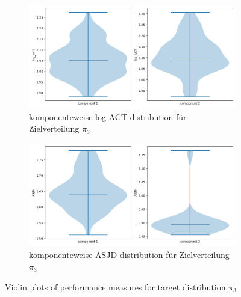 \documentclass{scrartcl}
\begin{document}
    \begin{figure}
        \centering
        \begin{subfigure}{0.45\textheight}
              \centering
              \includegraphics[width=.8\linewidth]{../figs/log_ACT_pi_3.png}
              \caption{komponenteweise log-ACT distribution für Zielverteilung $\pi_3$}
              \label{violin_plots_pi_3_act}
        \end{subfigure}
        \begin{subfigure}{0.45\textheight}
              \centering
              \includegraphics[width=.8\linewidth]{../figs/ASJD_pi_3.png}
              \caption{komponenteweise ASJD distribution für Zielverteilung $\pi_3$}
              \label{violin_plots_pi_3_asjd}
        \end{subfigure}
        \caption{Violin plots of performance measures for target distribution $\pi_3$}
        \label{violin_plots_pi_3}
    \end{figure}
\end{document}
